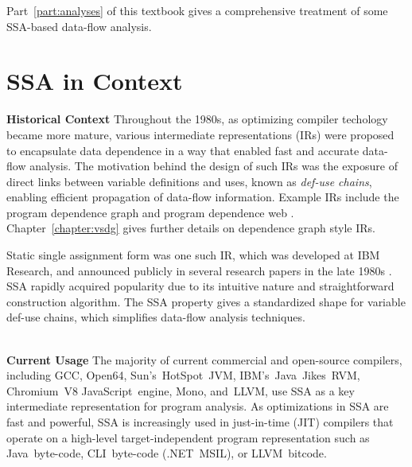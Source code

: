 Part~\ref{part:analyses} of this textbook gives a comprehensive treatment of 
some SSA-based data-flow analysis.






\section{SSA in Context}




\textbf{Historical Context }
Throughout the 1980s, as optimizing compiler
techology became more mature, various intermediate
representations (IRs) were proposed to encapsulate data
dependence in a way that enabled fast and accurate
data-flow analysis.
The motivation behind the design of
such IRs was the exposure of direct links between variable
definitions and uses, known as \textit{def-use chains},
enabling efficient propagation of data-flow information.
Example IRs include the program dependence graph \cite{ferrante87program}
and program dependence web \cite{ottenstein90program}.
Chapter~\ref{chapter:vsdg} gives further details on dependence graph
style IRs.


Static single assignment form was one such IR, 
which was developed at IBM Research, and announced publicly
in several research papers in the late 1980s
\cite{rosen88global,alpern88detecting,cytron89efficient}.
SSA rapidly acquired popularity due to its 
intuitive nature and straightforward
construction algorithm.
The SSA property gives a 
standardized shape for variable def-use chains,
which simplifies data-flow analysis techniques.

~\\
\textbf{Current Usage }
The majority of current commercial and open-source compilers, including  GCC, Open64, Sun's~HotSpot~JVM, IBM's~Java~Jikes~RVM, Chromium~V8 JavaScript~engine, Mono, and~LLVM,
use SSA as a key intermediate representation for
program analysis.
As optimizations in SSA are fast and powerful, SSA is increasingly used in
just-in-time (JIT) compilers that operate on a high-level target-independent
program representation such as Java~byte-code, CLI~byte-code (.NET~MSIL), or
LLVM~bitcode.

